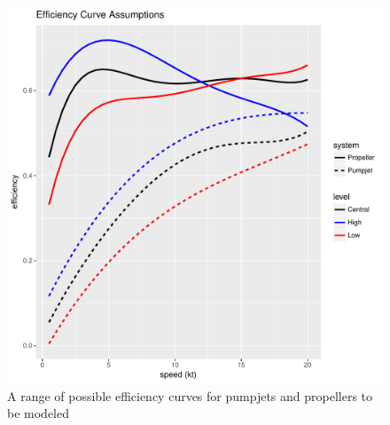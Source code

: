 \documentclass{article}\usepackage[]{graphicx}\usepackage[]{color}
\makeatletter
\def\maxwidth{ %
  \ifdim\Gin@nat@width>\linewidth
    \linewidth
  \else
    \Gin@nat@width
  \fi
}
\newenvironment{knitrout}{}{} %
\makeatother
\begin{document}
\begin{figure}
\begin{knitrout}
\color{fgcolor}

{\centering \includegraphics[width=\maxwidth]{figures/plots-plot_efficiency-1} 

}



\end{knitrout}
\caption{A range of possible efficiency curves for pumpjets and propellers to be modeled}
\label{fig:Efficiency_assumptions}
\end{figure}
\end{document}
